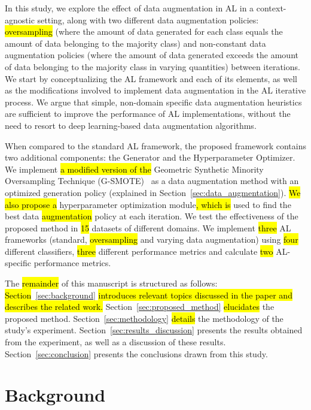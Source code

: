 \documentclass[preprint, 12pt]{elsarticle}
\begin{document}
In this study, we explore the effect of data augmentation in AL in a
context-agnostic setting, along with two different data augmentation policies:
\hl{oversampling} (where the amount of data generated for each class equals
the amount of data belonging to the majority class) and non-constant data
augmentation policies (where the amount of data generated exceeds the amount
of data belonging to the majority class in varying quantities) between
iterations. We start by conceptualizing the AL framework and each of its
elements, as well as the modifications involved to implement data augmentation
in the AL iterative process. We argue that simple, non-domain specific data
augmentation heuristics are sufficient to improve the performance of AL
implementations, without the need to resort to deep learning-based data
augmentation algorithms.

When compared to the standard AL framework, the proposed framework contains
two additional components: the Generator and the Hyperparameter Optimizer. We
implement \hl{a modified version of the }Geometric Synthetic Minority Oversampling
Technique (G-SMOTE)~\cite{Douzas2019} as a data augmentation method with an
optimized generation policy (explained in
Section~\ref{sec:data_augmentation}). \hl{We also propose a} hyperparameter
optimization module\hl{, which is} used to find the best data
\hl{augmentation} policy at each iteration. We test the effectiveness of the
proposed method in \hl{15} datasets of different domains. We implement
\hl{three} AL
frameworks (standard, \hl{oversampling} and varying data augmentation) using
\hl{four} different classifiers, \hl{three} different performance metrics and
calculate \hl{two} AL-specific performance metrics. 

The \hl{remainder} of this manuscript is structured as follows:
\hl{Section}~\ref{sec:background} \hl{introduces relevant topics discussed in
the paper and describes the related work.} Section~\ref{sec:proposed_method}
\hl{elucidates} the proposed method. Section~\ref{sec:methodology}
\hl{details} the methodology of the study's experiment.
Section~\ref{sec:results_discussion} presents the results obtained from the
experiment, as well as a discussion of these results.
Section~\ref{sec:conclusion} presents the conclusions drawn from this study.
 
\section{Background}~\label{sec:background}
\end{document}

